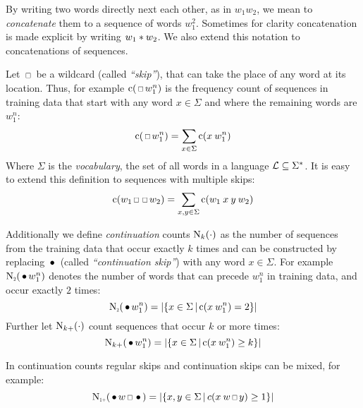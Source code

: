 By writing two words directly next each other, as in $w_1 w_2$, we mean to
\emph{concatenate} them to a sequence of words $w_1^2$.
Sometimes for clarity concatenation is made explicit by writing
$w_1 * w_2$. We also extend this notation to concatenations of
sequences.

Let $\Skp$ be a wildcard (called \emph{``skip''}), that can take the place
of any word at its location.
Thus, for example $\Count(\Skp w_1^n)$ is the frequency count of sequences
in training data that start with any word $x \in \Sigma$ and where the remaining
words are $w_1^n$:
\begin{equation}
  \Count(\Skp w_1^n) = \sum_{x \in \Sigma} \Count(x \: w_1^n)
\end{equation}
Where $\Sigma$ is the \emph{vocabulary}, the set of all words in a language
$\mathcal{L} \subseteq \Sigma^{*}$.
It is easy to extend this definition to sequences with multiple skips:
\begin{equation}
  \Count(w_1 \Skp \Skp w_2) = \sum_{x, y \in \Sigma} \Count(w_1 \: x \: y \: w_2)
\end{equation}

Additionally we define \emph{continuation} counts $\operatorname{N}_k(\cdot)$ as
the number of sequences from the training data that occur exactly $k$ times and
can be constructed by replacing $\,\bullet\,$ (called \emph{``continuation skip''})
with any word $x \in \Sigma$.
For example $\ContCountII(\WSkp w_1^n)$ denotes the number of words that can
precede $w_1^n$ in training data, and occur exactly $2$ times:
\begin{equation}
  \ContCountII(\WSkp w_1^n) =
    \Cardinality{\left\{ x \in \Sigma \,\middle|\, \Count(x \: w_1^n) = 2 \right\}}
\end{equation}
Further let $\operatorname{N}_{k+}(\cdot)$ count sequences that occur $k$ or more
times:
\begin{equation}
  \operatorname{N}_{k+}(\,\bullet\, w_1^n) =
    \left|\left\{ x \in \Sigma \,\middle|\, \operatorname{c}(x \: w_1^n) \geq k \right\}\right|
\end{equation}

In continuation counts regular skips and continuation skips can be mixed, for
example:
\begin{equation}
  \ContCountIp(\WSkp w \Skp \WSkp) =
    \Cardinality{\left\{ x, y \in \Sigma \,\middle|\, c(x \: w \Skp y) \geq 1 \right\}}
\end{equation}

